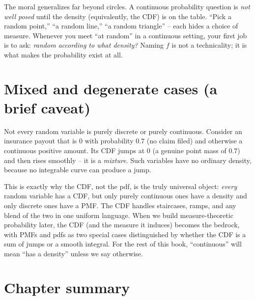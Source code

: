 \begin{happeningbox}
The moral generalizes far beyond circles. A continuous probability question is
\emph{not well posed} until the density (equivalently, the CDF) is on the table.
``Pick a random point,'' ``a random line,'' ``a random triangle'' -- each hides a
choice of measure. Whenever you meet ``at random'' in a continuous setting, your
first job is to ask: \emph{random according to what density?} Naming $f$ is not a
technicality; it is what makes the probability exist at all.
\end{happeningbox}

\section{Mixed and degenerate cases (a brief caveat)}
\label{ch10:mixed}

Not every random variable is purely discrete or purely continuous. Consider an
insurance payout that is $0$ with probability $0.7$ (no claim filed) and otherwise a
continuous positive amount. Its CDF jumps at $0$ (a genuine point mass of $0.7$) and
then rises smoothly -- it is a \emph{mixture}. Such variables have no ordinary
density, because no integrable curve can produce a jump.

\begin{marginnotebox}
This is exactly why the CDF, not the pdf, is the truly universal object: \emph{every}
random variable has a CDF, but only purely continuous ones have a density and only
discrete ones have a PMF. The CDF handles staircases, ramps, and any blend of the two
in one uniform language. When we build measure-theoretic probability later, the CDF
(and the measure it induces) becomes the bedrock, with PMFs and pdfs as two special
cases distinguished by whether the CDF is a sum of jumps or a smooth integral. For
the rest of this book, ``continuous'' will mean ``has a density'' unless we say
otherwise.
\end{marginnotebox}

\section{Chapter summary}
\label{ch10:summary}

